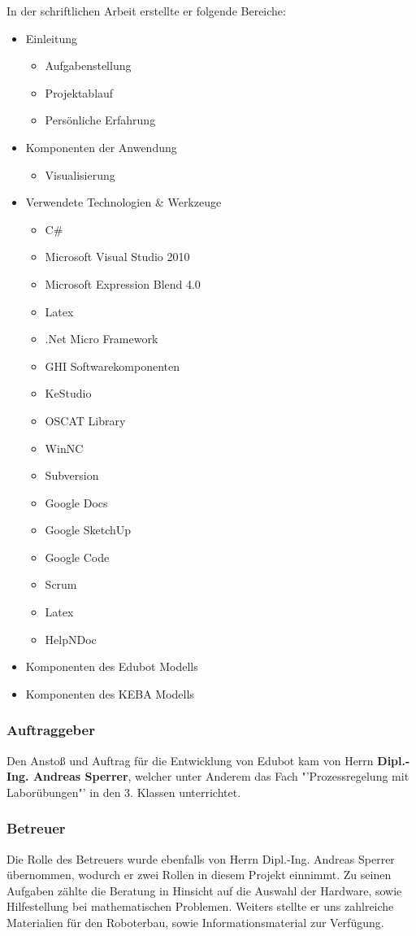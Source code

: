 \begin{itemize}
In der schriftlichen Arbeit erstellte er folgende Bereiche:
\begin{itemize}
\item Einleitung
\begin{itemize}
\item Aufgabenstellung
\item Projektablauf
\item Persönliche Erfahrung
\end{itemize}
\item Komponenten der Anwendung
\begin{itemize}
\item Visualisierung
\end{itemize}
\item Verwendete Technologien \& Werkzeuge
\begin{itemize}
\item C\#
\item Microsoft Visual Studio 2010
\item Microsoft Expression Blend 4.0
\item Latex
\item .Net Micro Framework
\item GHI Softwarekomponenten
\item KeStudio
\item OSCAT Library
\item WinNC
\item Subversion
\item Google Docs
\item Google SketchUp
\item Google Code
\item Scrum
\item Latex
\item HelpNDoc
\end{itemize}
\item Komponenten des Edubot Modells
\item Komponenten des KEBA Modells
\end{itemize}
     

\end{itemize}
   
\subsubsection{Auftraggeber}
Den Anstoß und Auftrag für die Entwicklung von Edubot kam von Herrn \textbf{Dipl.-Ing. Andreas Sperrer}, welcher unter Anderem das Fach "'Prozessregelung mit Laborübungen"' in den 3. Klassen unterrichtet.

\subsubsection{Betreuer}
Die Rolle des Betreuers wurde ebenfalls von Herrn Dipl.-Ing. Andreas Sperrer übernommen, wodurch er zwei Rollen in diesem Projekt einnimmt. Zu seinen Aufgaben zählte die Beratung in Hinsicht auf die Auswahl der Hardware, sowie Hilfestellung bei mathematischen Problemen. Weiters stellte er uns zahlreiche Materialien für den Roboterbau, sowie Informationsmaterial zur Verfügung.


